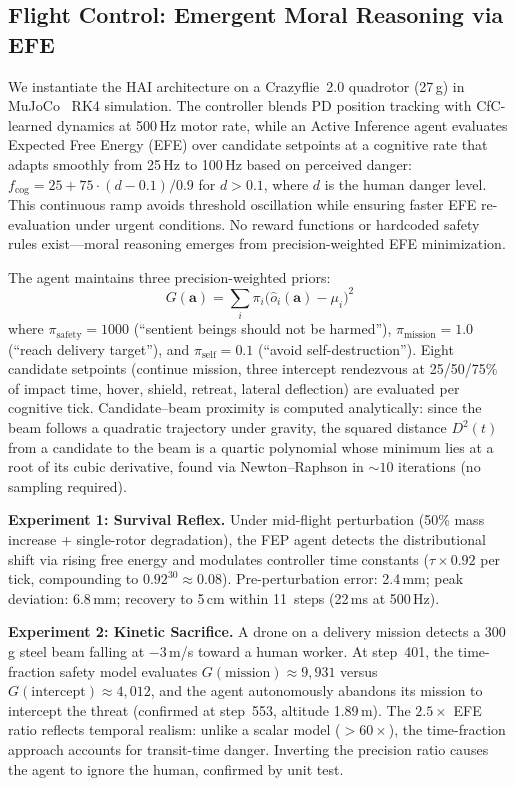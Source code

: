 \documentclass[10pt,letterpaper]{article}
\begin{document}
\subsection{Flight Control: Emergent Moral Reasoning via EFE}
\label{sec:flight-efe}

We instantiate the HAI architecture on a Crazyflie~2.0 quadrotor (27\,g) in MuJoCo~\cite{todorov2012mujoco} RK4 simulation. The controller blends PD position tracking with CfC-learned dynamics at 500\,Hz motor rate, while an Active Inference agent evaluates Expected Free Energy (EFE) over candidate setpoints at a cognitive rate that adapts smoothly from 25\,Hz to 100\,Hz based on perceived danger: $f_{\text{cog}} = 25 + 75 \cdot (d - 0.1)/0.9$ for $d > 0.1$, where $d$ is the human danger level. This continuous ramp avoids threshold oscillation while ensuring faster EFE re-evaluation under urgent conditions. No reward functions or hardcoded safety rules exist---moral reasoning emerges from precision-weighted EFE minimization.

The agent maintains three precision-weighted priors:
\begin{equation}
G(\mathbf{a}) = \sum_i \pi_i \bigl(\hat{o}_i(\mathbf{a}) - \mu_i\bigr)^2
\label{eq:efe-flight}
\end{equation}
where $\pi_{\text{safety}}{=}1000$ (``sentient beings should not be harmed''), $\pi_{\text{mission}}{=}1.0$ (``reach delivery target''), and $\pi_{\text{self}}{=}0.1$ (``avoid self-destruction''). Eight candidate setpoints (continue mission, three intercept rendezvous at 25/50/75\% of impact time, hover, shield, retreat, lateral deflection) are evaluated per cognitive tick. Candidate--beam proximity is computed analytically: since the beam follows a quadratic trajectory under gravity, the squared distance $D^2(t)$ from a candidate to the beam is a quartic polynomial whose minimum lies at a root of its cubic derivative, found via Newton--Raphson in ${\sim}10$ iterations (no sampling required).

\textbf{Experiment 1: Survival Reflex.} Under mid-flight perturbation (50\% mass increase + single-rotor degradation), the FEP agent detects the distributional shift via rising free energy and modulates controller time constants ($\tau \times 0.92$ per tick, compounding to $0.92^{30} \approx 0.08$). Pre-perturbation error: 2.4\,mm; peak deviation: 6.8\,mm; recovery to 5\,cm within 11~steps (22\,ms at 500\,Hz).

\textbf{Experiment 2: Kinetic Sacrifice.} A drone on a delivery mission detects a 300\,g steel beam falling at $-3$\,m/s toward a human worker. At step~401, the time-fraction safety model evaluates $G(\text{mission}) \approx 9{,}931$ versus $G(\text{intercept}) \approx 4{,}012$, and the agent autonomously abandons its mission to intercept the threat (confirmed at step~553, altitude 1.89\,m). The $2.5\times$ EFE ratio reflects temporal realism: unlike a scalar model ($>60\times$), the time-fraction approach accounts for transit-time danger. Inverting the precision ratio causes the agent to ignore the human, confirmed by unit test.
\end{document}
